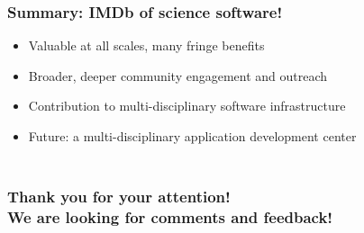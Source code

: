 \documentclass[hyperref={pdfpagelabels=false},12pt]{beamer}
\begin{document}
\begin{frame}
\frametitle{Summary: IMDb of science software!}
\begin{itemize}
\itemsep1em
\item Valuable at all scales, many fringe benefits
\item Broader, deeper community engagement and outreach
\item Contribution to multi-disciplinary software infrastructure
\item Future: a multi-disciplinary application development center
\end{itemize}
\end{frame}

\begin{frame}
\frametitle{\\ \centering Thank you for your attention! \\ We are looking for comments and feedback!}
\end{frame}
\end{document}
